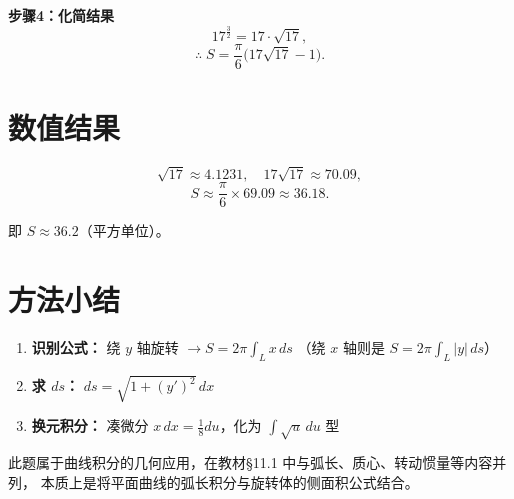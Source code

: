 \documentclass[12pt,a4paper]{ctexart}
\newcommand{\answerbox}[1]{%
  \begin{center}
  \fbox{\color{red}\large\bfseries #1}
  \end{center}
}
\begin{document}
\medskip

\noindent\textbf{步骤4：化简结果}
\[
17^{\frac{3}{2}} = 17 \cdot \sqrt{17},
\]
\[
\therefore\;
S = \frac{\pi}{6} \bigl( 17\sqrt{17} - 1 \bigr).
\]

\bigskip

\answerbox{$\displaystyle S = \frac{\pi}{6}\bigl(17\sqrt{17} - 1\bigr)$}

\bigskip

\section*{数值结果}

\[
\sqrt{17} \approx 4.1231,\quad
17\sqrt{17} \approx 70.09,
\]
\[
S \approx \frac{\pi}{6} \times 69.09 \approx 36.18.
\]

即 $S \approx 36.2$（平方单位）。

\section*{方法小结}

\begin{enumerate}[leftmargin=*,itemsep=4pt]
  \item \textbf{识别公式：} 绕 $y$ 轴旋转 $\to S = 2\pi\int_L x\,ds$\;
        （绕 $x$ 轴则是 $S = 2\pi\int_L |y|\,ds$）
  \item \textbf{求 $ds$：} $ds = \sqrt{1+(y')^2}\,dx$
  \item \textbf{换元积分：} 凑微分 $x\,dx = \frac{1}{8}du$，化为 $\int \sqrt{u}\,du$ 型
\end{enumerate}

此题属于曲线积分的几何应用，在教材\S11.1 中与弧长、质心、转动惯量等内容并列，
本质上是将平面曲线的弧长积分与旋转体的侧面积公式结合。
\end{document}
